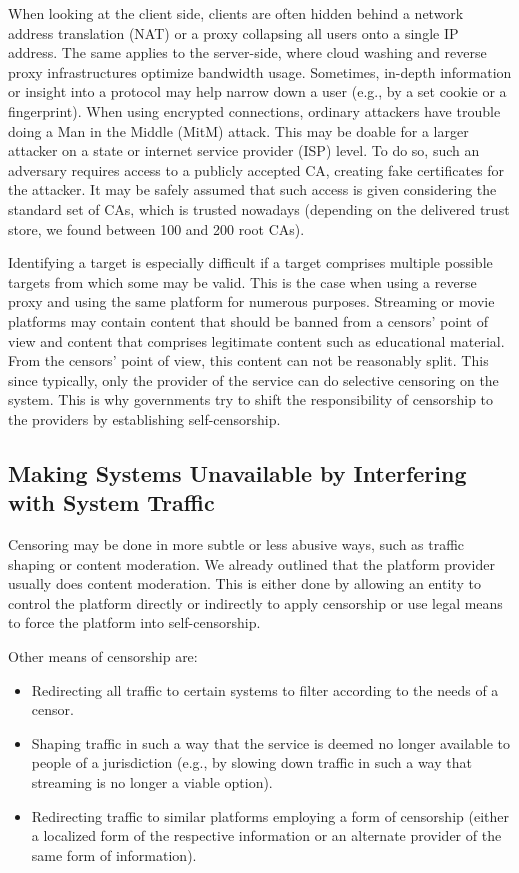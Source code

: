 When looking at the client side, clients are often hidden behind a network address translation (NAT) or a proxy collapsing all users onto a single IP address. The same applies to the server-side, where cloud washing and reverse proxy infrastructures optimize bandwidth usage. Sometimes, in-depth information or insight into a protocol may help narrow down a user (e.g., by a set cookie or a fingerprint). When using encrypted connections, ordinary attackers have trouble doing a Man in the Middle (MitM) attack. This may be doable for a larger attacker on a state or internet service provider (ISP) level. To do so, such an adversary requires access to a publicly accepted CA, creating fake certificates for the attacker. It may be safely assumed that such access is given considering the standard set of CAs, which is trusted nowadays (depending on the delivered trust store, we found between 100 and 200 root CAs).

Identifying a target is especially difficult if a target comprises multiple possible targets from which some may be valid. This is the case when using a reverse proxy and using the same platform for numerous purposes. Streaming or movie platforms may contain content that should be banned from a censors' point of view and content that comprises legitimate content such as educational material. From the censors' point of view, this content can not be reasonably split. This since typically, only the provider of the service can do selective censoring on the system. This is why governments try to shift the responsibility of censorship to the providers by establishing self-censorship. 

\subsection{Making Systems Unavailable by Interfering with System Traffic}
Censoring may be done in more subtle or less abusive ways, such as traffic shaping or content moderation. We already outlined that the platform provider usually does content moderation. This is either done by allowing an entity to control the platform directly or indirectly to apply censorship or use legal means to force the platform into self-censorship.

Other means of censorship are:
\begin{itemize}
	\item Redirecting all traffic to certain systems to filter according to the needs of a censor.
	\item Shaping traffic in such a way that the service is deemed no longer available to people of a jurisdiction (e.g., by slowing down traffic in such a way that streaming is no longer a viable option).
	\item Redirecting traffic to similar platforms employing a form of censorship (either a localized form of the respective information or an alternate provider of the same form of information).
\end{itemize}

